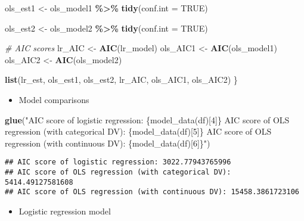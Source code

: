 \documentclass[
]{book}
\newenvironment{Shaded}{\begin{snugshade}}{\end{snugshade}}
\newcommand{\CommentTok}[1]{\textcolor[rgb]{0.56,0.35,0.01}{\textit{#1}}}
\newcommand{\DataTypeTok}[1]{\textcolor[rgb]{0.13,0.29,0.53}{#1}}
\newcommand{\KeywordTok}[1]{\textcolor[rgb]{0.13,0.29,0.53}{\textbf{#1}}}
\newcommand{\NormalTok}[1]{#1}
\newcommand{\OperatorTok}[1]{\textcolor[rgb]{0.81,0.36,0.00}{\textbf{#1}}}
\newcommand{\OtherTok}[1]{\textcolor[rgb]{0.56,0.35,0.01}{#1}}
\newcommand{\StringTok}[1]{\textcolor[rgb]{0.31,0.60,0.02}{#1}}
\providecommand{\tightlist}{%
  \setlength{\itemsep}{0pt}\setlength{\parskip}{0pt}}
\begin{document}
\begin{Shaded}
\begin{Highlighting}[]
\NormalTok{ols\_est1 \textless{}{-}}\StringTok{ }\NormalTok{ols\_model1 }\OperatorTok{\%\textgreater{}\%}
\StringTok{    }\KeywordTok{tidy}\NormalTok{(}\DataTypeTok{conf.int =} \OtherTok{TRUE}\NormalTok{) }

\NormalTok{ols\_est2 \textless{}{-}}\StringTok{ }\NormalTok{ols\_model2 }\OperatorTok{\%\textgreater{}\%}
\StringTok{    }\KeywordTok{tidy}\NormalTok{(}\DataTypeTok{conf.int =} \OtherTok{TRUE}\NormalTok{) }

\CommentTok{\# AIC scores }
\NormalTok{lr\_AIC \textless{}{-}}\StringTok{ }\KeywordTok{AIC}\NormalTok{(lr\_model)}
\NormalTok{ols\_AIC1 \textless{}{-}}\StringTok{ }\KeywordTok{AIC}\NormalTok{(ols\_model1)}
\NormalTok{ols\_AIC2 \textless{}{-}}\StringTok{ }\KeywordTok{AIC}\NormalTok{(ols\_model2)}
    
\KeywordTok{list}\NormalTok{(lr\_est, ols\_est1, ols\_est2, lr\_AIC, ols\_AIC1, ols\_AIC2)}
\NormalTok{\}}
\end{Highlighting}
\end{Shaded}

\begin{itemize}
\tightlist
\item
  Model comparisons
\end{itemize}

\begin{Shaded}
\begin{Highlighting}[]
\KeywordTok{glue}\NormalTok{(}\StringTok{"AIC score of logistic regression: \{model\_data(df)[4]\} }
\StringTok{      AIC score of OLS regression (with categorical DV):  \{model\_data(df)[5]\}}
\StringTok{      AIC score of OLS regression (with continuous DV): \{model\_data(df)[6]\}"}\NormalTok{)}
\end{Highlighting}
\end{Shaded}

\begin{verbatim}
## AIC score of logistic regression: 3022.77943765996 
## AIC score of OLS regression (with categorical DV):  5414.49127581608
## AIC score of OLS regression (with continuous DV): 15458.3861723106
\end{verbatim}

\begin{itemize}
\tightlist
\item
  Logistic regression model
\end{itemize}
\end{document}
